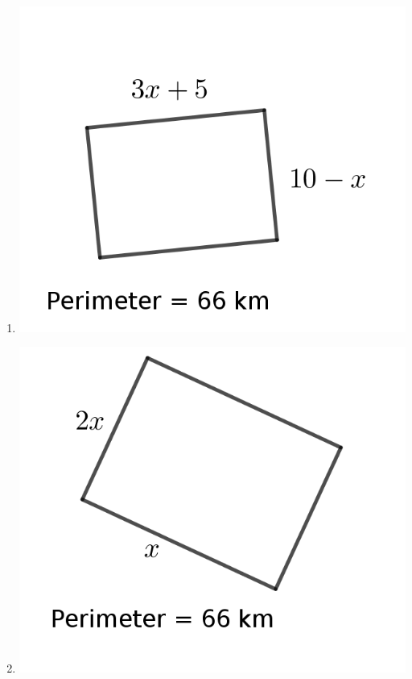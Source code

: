 \begin{multicols}{2}
\begin{enumerate}
	\item \includegraphics{./Images/Measurement/perAlg3.png}
	\item \includegraphics{./Images/Measurement/perAlg4.png}

\end{enumerate}
\end{multicols}

